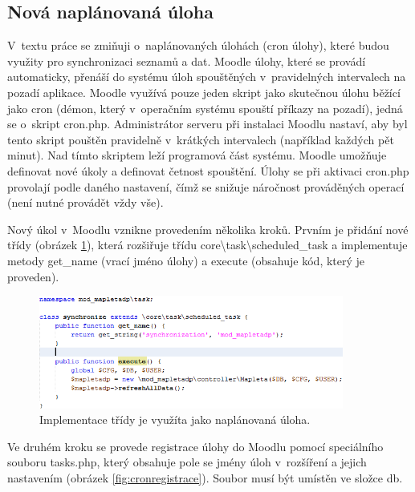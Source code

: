 \documentclass[
print,
  11pt,
  table,   
  nolof,    
  nolot,
  oneside,
  draft
]{fithesis3}
\begin{document}
		\subsection{Nová naplánovaná úloha}
V~textu práce se zmiňuji o~naplánovaných úlohách (cron úlohy), které budou využity pro synchronizaci seznamů a dat. Moodle úlohy, které se provádí automaticky, přenáší do systému úloh spouštěných v~pravidelných intervalech na pozadí aplikace. Moodle využívá pouze jeden skript jako skutečnou úlohu běžící jako cron (démon, který v~operačním systému spouští příkazy na pozadí), jedná se o~skript cron.php. Administrátor serveru při instalaci Moodlu nastaví, aby byl tento skript pouštěn pravidelně v~krátkých intervalech (například každých pět minut). Nad tímto skriptem leží programová část systému. Moodle umožňuje definovat nové úkoly a definovat četnost spouštění. Úlohy se při aktivaci cron.php provolají podle daného nastavení, čímž se snižuje náročnost prováděných operací (není nutné provádět vždy vše). 

Nový úkol v~Moodlu vznikne provedením několika kroků. Prvním je přidání nové třídy (obrázek \ref{fig:crontrida}), která rozšiřuje třídu core{\textbackslash}task{\textbackslash}scheduled\_task a implementuje metody get\_name (vrací jméno úlohy) a execute (obsahuje kód, který je proveden).


		\begin{figure}
		  \begin{center}
		    \includegraphics[width=100mm]{images/cron-trida.png}
		   \end{center}
		  \caption{Implementace třídy je využíta jako naplánovaná úloha. }
		  \label{fig:crontrida}
		\end{figure}
Ve druhém kroku se provede registrace úlohy do Moodlu pomocí speciálního souboru tasks.php, který obsahuje pole se jmény úloh v~rozšíření a jejich nastavením (obrázek \ref{fig:cronregistrace}). Soubor musí být umístěn ve složce db.
\end{document}
